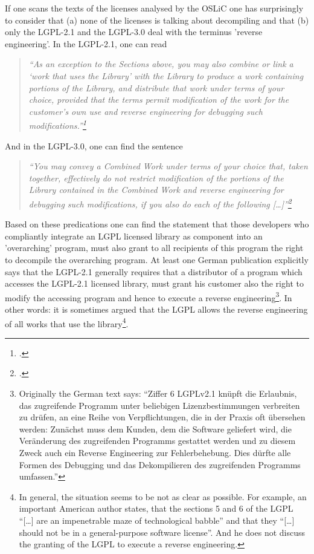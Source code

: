 If one scans the texts of the licenses analysed by the OSLiC one has
surprisingly to consider that (a) none of the licenses is talking about
decompiling and that (b) only the LGPL-2.1 and the LGPL-3.0 deal with the
terminus 'reverse engineering'. In the LGPL-2.1, one can read

\begin{quote}\emph{
\enquote{As an exception to the Sections above, you may also combine or
link a \enquote{work that uses the Library} with the Library to produce a work
containing portions of the Library, and distribute that work under terms of your
choice, \emph{provided that the terms permit} modification of the work for the
customer's own use and \emph{reverse engineering} for debugging such
modifications.}\footcite[cf.][\nopage wp]{Lgpl21OsiLicense1999a}}
\end{quote}


And in the LGPL-3.0, one can find the sentence

\begin{quote}\emph{
\enquote{You may convey a Combined Work under terms of your choice that,
taken together, effectively \emph{do not restrict} modification of the portions
of the Library contained in the Combined Work and \emph{reverse engineering} for
debugging such modifications, if you also do each of the following
[\ldots]}\footcite[cf.][\nopage wp]{Lgpl30OsiLicense2007a}}
\end{quote}

Based on these predications one can find the statement that those developers who
compliantly integrate an LGPL licensed library as component into an
'overarching' program, must also grant to all recipients of this program the
right to decompile the overarching program. At least one German publication
explicitly says that the LGPL-2.1 generally requires that a distributor of a
program which accesses the LGPL-2.1 licensed library, must grant his customer
also the right to modify the accessing program and hence to execute a reverse
engineering\footnote{Originally the German text says: \enquote{Ziffer 6 LGPLv2.1
knüpft die Erlaubnis, das zugreifende Programm unter beliebigen
Lizenzbestimmungen verbreiten zu drüfen, an eine Reihe von Verpflichtungen, die
in der Praxis oft übersehen werden: Zunächst muss dem Kunden, dem die Software
geliefert wird, die Veränderung des zugreifenden Programms gestattet werden und
zu diesem Zweck auch ein Reverse Engineering zur Fehlerbehebung. Dies dürfte
alle Formen des Debugging und das Dekompilieren des zugreifenden Programms
umfassen.}\cite[cf.][81]{JaeMet2011a} }. In other words: it is sometimes argued
that the LGPL allows the reverse engineering of all works that use the
library\footnote{In general, the situation seems to be not as clear as possible.
For example, an important American author states, that the sections 5 and 6 of
the LGPL \enquote{[\ldots] are an impenetrable maze of technological babble} and
that they \enquote{[\ldots] should not be in a general-purpose software
license}\cite[cf.][124]{Rosen2005a}. And he does not discuss the granting of
the LGPL to execute a reverse engineering.}.

